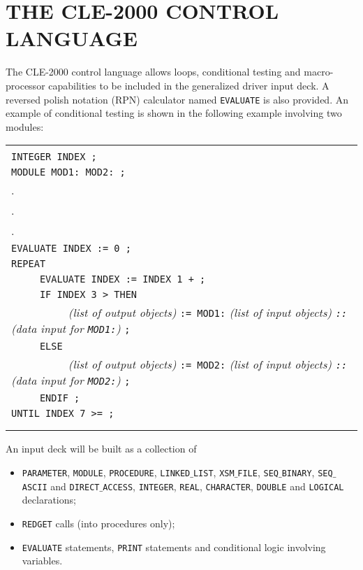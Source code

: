 \section{THE CLE-2000 CONTROL LANGUAGE}

The CLE-2000 control language allows  loops, conditional testing and
macro-processor capabilities to be included in the generalized driver input
deck. A reversed polish notation (RPN) calculator named {\tt EVALUATE} is also
provided. An example of conditional testing is shown in the following example
involving two modules:

\vskip 0.4cm

\noindent\begin{tabular}{|l|}
\hline \\
{\tt INTEGER INDEX ;} \\
{\tt MODULE MOD1: MOD2: ;} \\
. \\
. \\
. \\
{\tt EVALUATE INDEX := 0 ;} \\
{\tt REPEAT} \\
{\tt ~~~~~EVALUATE INDEX := INDEX 1 + ;} \\
{\tt ~~~~~IF INDEX 3 > THEN} \\
{\tt ~~~~~~~~~~}{\sl (list of output objects)} {\tt := MOD1:} {\sl (list of input objects) {\tt ::} (data input for {\tt MOD1:})} {\tt ; }\\
{\tt ~~~~~ELSE} \\
{\tt ~~~~~~~~~~}{\sl (list of output objects)} {\tt := MOD2:} {\sl (list of input objects) {\tt ::} (data input for {\tt MOD2:})} {\tt ;} \\
{\tt ~~~~~ENDIF ;} \\
{\tt UNTIL INDEX 7 >= ;} \\
\\ \\ \hline
\end{tabular}

\vskip 0.4cm

An input deck will be built as a collection of 
\begin{itemize}
\item {\tt PARAMETER}, {\tt MODULE}, {\tt PROCEDURE}, {\tt LINKED}$\_${\tt LIST}, {\tt XSM}$\_${\tt FILE}, {\tt SEQ}$\_${\tt BINARY}, {\tt SEQ}$\_${\tt ASCII} and {\tt DIRECT}$\_${\tt ACCESS}, {\tt INTEGER}, {\tt REAL}, {\tt CHARACTER}, {\tt DOUBLE} and {\tt LOGICAL} declarations;
\item {\tt REDGET} calls (into procedures only);
\item {\tt EVALUATE} statements, {\tt PRINT} statements and conditional logic involving variables.
\end{itemize}

